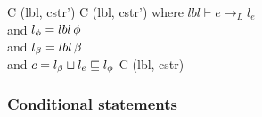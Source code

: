 \begin{trules}
        { {C} {(lbl, cstr')} }
        { {C} {(lbl, cstr')} }
        {where $lbl \vdash e \rightarrow_L l_e$\\
          and $l_\phi = lbl \, \phi$\\
          and $l_\beta = lbl \, \beta$\\
          and $c = l_\beta \sqcup l_e \sqsubseteq l_\phi$}
        { {C} {(lbl, cstr)} }
        {}
        {}
        {}
\end{trules}

\subsubsection{Conditional statements}

